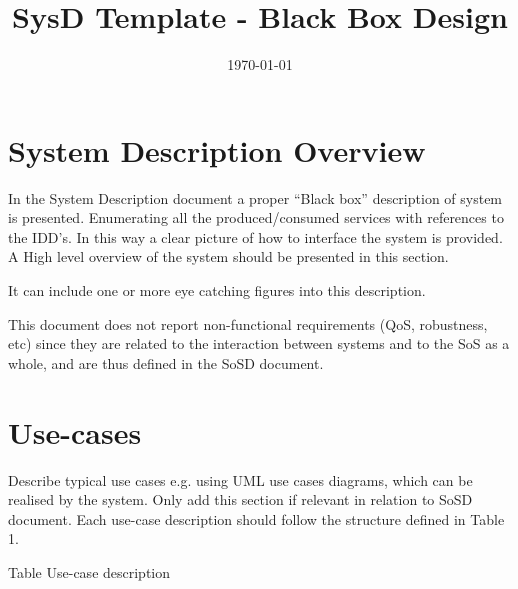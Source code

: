 \documentclass{article}
\date{\today} & 1.2 \\
\title{SysD Template - Black Box Design}
\newcounter{Table}
\renewcommand\theTable{\arabic{Table}}
\begin{document}
\maketitle

\tableofcontents
\newpage

\section{System Description Overview}

In the System Description document a proper ``Black box'' description of system is presented. Enumerating all the produced/consumed services with references to the IDD's. In this way a clear picture of how to interface the system is provided. A High level overview of the system should be presented in this section.

It can include one or more eye catching figures into this description.

This document does not report non-functional requirements (QoS, robustness, etc) since they are related to the interaction between systems and to the SoS as a whole, and are thus defined in the SoSD document.


\section{Use-cases }
Describe typical use cases e.g. using UML use cases diagrams, which can be realised by the system. Only add this section if relevant in relation to SoSD document. Each use-case description should follow the structure defined in Table 1.

Table \stepcounter{Table}{\theTable} Use-case description
\end{document}
